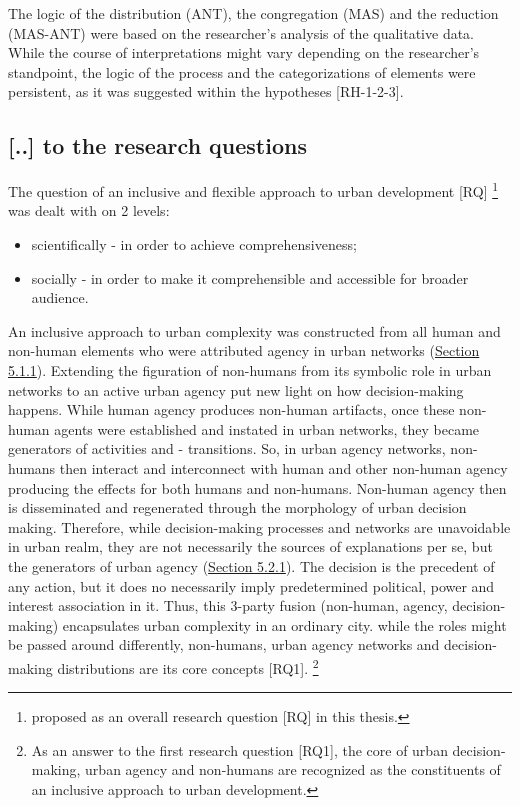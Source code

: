 \documentclass[11pt]{report}
\begin{document}
{The logic of the distribution (ANT), the congregation (MAS) and the reduction (MAS-ANT) were based on the researcher's analysis of the qualitative data. While the course of interpretations might vary depending on the researcher's standpoint, the logic of the process and the categorizations of elements were persistent, as it was suggested within the hypotheses [RH-1-2-3].

\subsection{[..] to the research questions}

The question of an inclusive and flexible approach to urban development [RQ]
\footnote{proposed as an overall research question [RQ] in this thesis.}
was dealt with on 2 levels:

\begin{itemize}
\item scientifically - in order to achieve comprehensiveness;
\item socially - in order to make it comprehensible and accessible for broader audience.
\end{itemize}

An inclusive approach to urban complexity was constructed from all human and non-human elements who were attributed agency in urban networks (\href{Section 5.1.1}{Section 5.1.1}).
Extending the figuration of non-humans from its symbolic role in urban networks to an active urban agency put new light on how decision-making happens.
While human agency produces non-human artifacts, once these non-human agents were established and instated in urban networks, they became generators of activities and - transitions. 
So, in urban agency networks, non-humans then interact and interconnect with human and other non-human agency producing the effects for both humans and non-humans.
Non-human agency then is disseminated and regenerated through the morphology of urban decision making.
Therefore, while decision-making processes and networks are unavoidable in urban realm, they are not necessarily the sources of explanations per se, but the generators of urban agency (\href{Section 5.2.1}{Section 5.2.1}). The decision is the precedent of any action, but it does no necessarily imply predetermined political, power and interest association in it. 
Thus, this 3-party fusion (non-human, agency, decision-making) encapsulates urban complexity in an ordinary city. while the roles might be passed around differently, non-humans, urban agency networks and decision-making distributions are its core concepts [RQ1].
\footnote{As an answer to the first research question [RQ1], the core of urban decision-making, urban agency and non-humans are recognized as the constituents of an inclusive approach to urban development.}
\\

}
\end{document}
